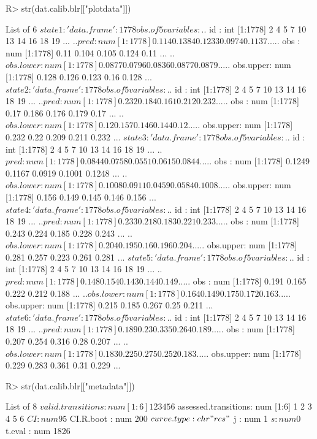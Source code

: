 \documentclass[article,shortnames]{jss}
\begin{document}
\begin{Schunk}
\begin{Sinput}
R> str(dat.calib.blr[["plotdata"]])
\end{Sinput}
\begin{Soutput}
List of 6
 $ state1:'data.frame':	1778 obs. of  5 variables:
  ..$ id       : int [1:1778] 2 4 5 7 10 13 14 16 18 19 ...
  ..$ pred     : num [1:1778] 0.114 0.1384 0.1233 0.0974 0.1137 ...
  ..$ obs      : num [1:1778] 0.11 0.104 0.105 0.124 0.11 ...
  ..$ obs.lower: num [1:1778] 0.0877 0.0796 0.0836 0.0877 0.0879 ...
  ..$ obs.upper: num [1:1778] 0.128 0.126 0.123 0.16 0.128 ...
 $ state2:'data.frame':	1778 obs. of  5 variables:
  ..$ id       : int [1:1778] 2 4 5 7 10 13 14 16 18 19 ...
  ..$ pred     : num [1:1778] 0.232 0.184 0.161 0.212 0.232 ...
  ..$ obs      : num [1:1778] 0.17 0.186 0.176 0.179 0.17 ...
  ..$ obs.lower: num [1:1778] 0.12 0.157 0.146 0.144 0.12 ...
  ..$ obs.upper: num [1:1778] 0.232 0.22 0.209 0.211 0.232 ...
 $ state3:'data.frame':	1778 obs. of  5 variables:
  ..$ id       : int [1:1778] 2 4 5 7 10 13 14 16 18 19 ...
  ..$ pred     : num [1:1778] 0.0844 0.0758 0.0551 0.0615 0.0844 ...
  ..$ obs      : num [1:1778] 0.1249 0.1167 0.0919 0.1001 0.1248 ...
  ..$ obs.lower: num [1:1778] 0.1008 0.0911 0.0459 0.0584 0.1008 ...
  ..$ obs.upper: num [1:1778] 0.156 0.149 0.145 0.146 0.156 ...
 $ state4:'data.frame':	1778 obs. of  5 variables:
  ..$ id       : int [1:1778] 2 4 5 7 10 13 14 16 18 19 ...
  ..$ pred     : num [1:1778] 0.233 0.218 0.183 0.221 0.233 ...
  ..$ obs      : num [1:1778] 0.243 0.224 0.185 0.228 0.243 ...
  ..$ obs.lower: num [1:1778] 0.204 0.195 0.16 0.196 0.204 ...
  ..$ obs.upper: num [1:1778] 0.281 0.257 0.223 0.261 0.281 ...
 $ state5:'data.frame':	1778 obs. of  5 variables:
  ..$ id       : int [1:1778] 2 4 5 7 10 13 14 16 18 19 ...
  ..$ pred     : num [1:1778] 0.148 0.154 0.143 0.144 0.149 ...
  ..$ obs      : num [1:1778] 0.191 0.165 0.222 0.212 0.188 ...
  ..$ obs.lower: num [1:1778] 0.164 0.149 0.175 0.172 0.163 ...
  ..$ obs.upper: num [1:1778] 0.215 0.185 0.267 0.25 0.211 ...
 $ state6:'data.frame':	1778 obs. of  5 variables:
  ..$ id       : int [1:1778] 2 4 5 7 10 13 14 16 18 19 ...
  ..$ pred     : num [1:1778] 0.189 0.23 0.335 0.264 0.189 ...
  ..$ obs      : num [1:1778] 0.207 0.254 0.316 0.28 0.207 ...
  ..$ obs.lower: num [1:1778] 0.183 0.225 0.275 0.252 0.183 ...
  ..$ obs.upper: num [1:1778] 0.229 0.283 0.361 0.31 0.229 ...
\end{Soutput}
\begin{Sinput}
R> str(dat.calib.blr[["metadata"]])
\end{Sinput}
\begin{Soutput}
List of 8
 $ valid.transitions   : num [1:6] 1 2 3 4 5 6
 $ assessed.transitions: num [1:6] 1 2 3 4 5 6
 $ CI                  : num 95
 $ CI.R.boot           : num 200
 $ curve.type          : chr "rcs"
 $ j                   : num 1
 $ s                   : num 0
 $ t.eval              : num 1826
\end{Soutput}
\end{Schunk}
\end{document}
